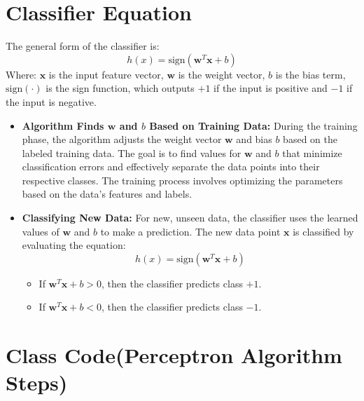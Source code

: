 \section{Classifier Equation}


The general form of the classifier is:
\[
h(x) = \text{sign}(\mathbf{w}^T \mathbf{x} + b)
\]
Where:
\( \mathbf{x} \) is the input feature vector,
\( \mathbf{w} \) is the weight vector,
\( b \) is the bias term,
\( \text{sign}(\cdot) \) is the sign function, which outputs \( +1 \) if the input is positive and \( -1 \) if the input is negative.

\begin{itemize}
    \item \textbf{Algorithm Finds \( \mathbf{w} \) and \( b \) Based on Training Data:} 
    During the training phase, the algorithm adjusts the weight vector \( \mathbf{w} \) and bias \( b \) based on the labeled training data. 
    The goal is to find values for \( \mathbf{w} \) and \( b \) that minimize classification errors and effectively separate the data points into their respective classes. 
    The training process involves optimizing the parameters based on the data's features and labels.

    \item \textbf{Classifying New Data:} 
    For new, unseen data, the classifier uses the learned values of \( \mathbf{w} \) and \( b \) to make a prediction. 
    The new data point \( \mathbf{x} \) is classified by evaluating the equation:
    \[
    h(x) = \text{sign}(\mathbf{w}^T \mathbf{x} + b)
    \]
    \begin{itemize}
        \item If \( \mathbf{w}^T \mathbf{x} + b > 0 \), then the classifier predicts class \( +1 \).
        \item If \( \mathbf{w}^T \mathbf{x} + b < 0 \), then the classifier predicts class \( -1 \).
    \end{itemize}
\end{itemize}

\section{Class Code(Perceptron Algorithm Steps)}


